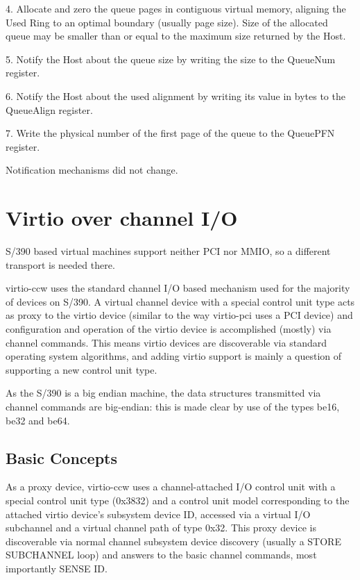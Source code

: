 4. Allocate and zero the queue pages in contiguous virtual
   memory, aligning the Used Ring to an optimal boundary (usually
   page size). Size of the allocated queue may be smaller than or
   equal to the maximum size returned by the Host.

5. Notify the Host about the queue size by writing the size to
   the QueueNum register.

6. Notify the Host about the used alignment by writing its value
   in bytes to the QueueAlign register.

7. Write the physical number of the first page of the queue to
   the QueuePFN register.

Notification mechanisms did not change.

\section{Virtio over channel I/O}\label{sec:Virtio Transport Options / Virtio over channel I/O}

S/390 based virtual machines support neither PCI nor MMIO, so a
different transport is needed there.

virtio-ccw uses the standard channel I/O based mechanism used for
the majority of devices on S/390. A virtual channel device with a
special control unit type acts as proxy to the virtio device
(similar to the way virtio-pci uses a PCI device) and
configuration and operation of the virtio device is accomplished
(mostly) via channel commands. This means virtio devices are
discoverable via standard operating system algorithms, and adding
virtio support is mainly a question of supporting a new control
unit type.

As the S/390 is a big endian machine, the data structures transmitted
via channel commands are big-endian: this is made clear by use of
the types be16, be32 and be64.

\subsection{Basic Concepts}\label{sec:Virtio Transport Options / Virtio over channel I/O / Basic Concepts}

As a proxy device, virtio-ccw uses a channel-attached I/O control
unit with a special control unit type (0x3832) and a control unit
model corresponding to the attached virtio device's subsystem
device ID, accessed via a virtual I/O subchannel and a virtual
channel path of type 0x32. This proxy device is discoverable via
normal channel subsystem device discovery (usually a STORE
SUBCHANNEL loop) and answers to the basic channel commands, most
importantly SENSE ID.


